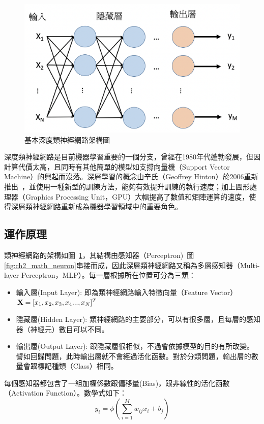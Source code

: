 \begin{figure}[h]
\centering
\includegraphics[scale=0.3]{images/ch2_DNN.png}
\caption{基本深度類神經網路架構圖} \label{fig:ch2_DNN}
\end{figure}

深度類神經網路是目前機器學習重要的一個分支，曾經在1980年代蓬勃發展，但因計算代價太高，且同時有其他簡單的模型如支撐向量機（Support
Vector Machine）的興起而沒落。深層學習的概念由辛氏（Geoffrey Hinton）於2006重新推出~\cite{hinton2006fast}，並使用一種新型的訓練方法，能夠有效提升訓練的執行速度；加上圖形處理器（Graphics
Processing
Unit，GPU）大幅提高了數值和矩陣運算的速度，使得深層類神經網路重新成為機器學習領域中的重要角色。
\subsection{運作原理}
類神經網路的架構如圖~\ref{fig:ch2_DNN}，其結構由感知器（Perceptron)~圖\ref{fig:ch2_math_neuron}串接而成，因此深層類神經網路又稱為多層感知器（Multi-layer
Perceptron，MLP）。每一層根據所在位置可分為三類：
\begin{itemize}
\item    輸入層(Input Layer): 即為類神經網路輸入特徵向量（Feature Vector）$\bold{X} = [x_1 , x_2 , x_3 , x_4 ... , x_N]^T$
\item    隱藏層(Hidden Layer): 類神經網路的主要部分，可以有很多層，且每層的感知器（神經元）數目可以不同。
\item    輸出層(Output Layer): 跟隱藏層很相似，不過會依據模型的目的有所改變。譬如回歸問題，此時輸出層就不會經過活化函數。對於分類問題，輸出層的數量會跟標記種類（Class）相同。
\end{itemize}

每個感知器都包含了一組加權係數跟偏移量(Bias)，跟非線性的活化函數（Activation
Function）。數學式如下：
\begin{equation}
	y_i = \phi{(\sum_{i=1}^{M} w_{ij}x_i+b_j) }
\end{equation}

